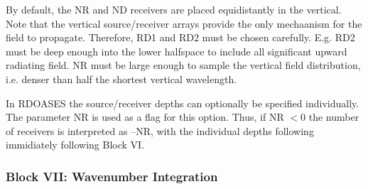 By default, the NR and ND receivers are placed equidistantly in the vertical.
Note that the vertical source/receiver arrays provide the only
mechaanism for the field to propagate. Therefore, RD1 and RD2 must be
chosen carefully. E.g. RD2 must be deep enough into the lower
halfspace to include all significant upward radiating field. NR must
be large enough to sample the vertical field distribution, i.e. denser
than half the shortest vertical wavelength.


In RDOASES the source/receiver depths can optionally be specified individually.
The parameter NR is used as a flag for this option. Thus, if NR $< 0$
the number of receivers is interpreted as --NR, with the individual
depths following immidiately following Block VI. 


\subsubsection{Block VII: Wavenumber Integration}

